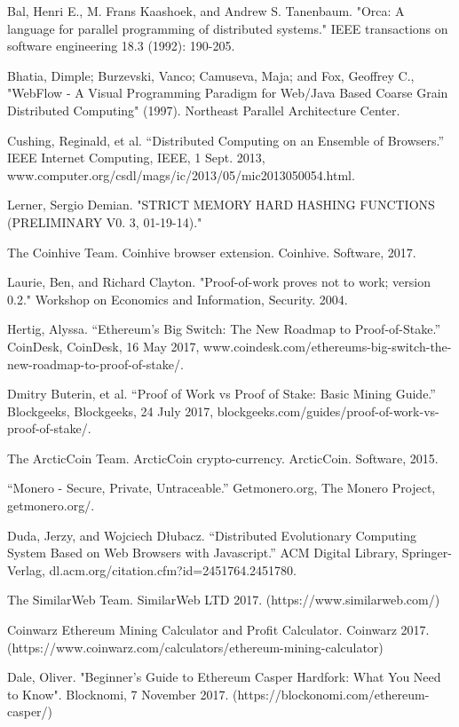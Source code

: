 \documentclass[runningheads]{llncs}
\begin{document}
\begin{thebibliography}{1}
Bal, Henri E., M. Frans Kaashoek, and Andrew S. Tanenbaum. "Orca: A language for parallel programming of distributed systems." IEEE transactions on software engineering 18.3 (1992): 190-205.

Bhatia, Dimple; Burzevski, Vanco; Camuseva, Maja; and Fox, Geoffrey C., "WebFlow - A Visual Programming Paradigm for Web/Java Based Coarse Grain Distributed Computing" (1997).
Northeast Parallel Architecture Center.

 Cushing, Reginald, et al. “Distributed Computing on an Ensemble of Browsers.” IEEE Internet Computing, IEEE, 1 Sept. 2013, www.computer.org/csdl/mags/ic/2013/05/mic2013050054.html.

 Lerner, Sergio Demian. "STRICT MEMORY HARD HASHING FUNCTIONS (PRELIMINARY V0. 3, 01-19-14)."

The Coinhive Team. Coinhive browser extension. Coinhive. Software, 2017.

Laurie, Ben, and Richard Clayton. "Proof-of-work proves not to work; version 0.2." Workshop on Economics and Information, Security. 2004.

Hertig, Alyssa. “Ethereum's Big Switch: The New Roadmap to Proof-of-Stake.” CoinDesk, CoinDesk, 16 May 2017, www.coindesk.com/ethereums-big-switch-the-new-roadmap-to-proof-of-stake/. 

Dmitry Buterin, et al. “Proof of Work vs Proof of Stake: Basic Mining Guide.” Blockgeeks, Blockgeeks, 24 July 2017, blockgeeks.com/guides/proof-of-work-vs-proof-of-stake/. 

The ArcticCoin Team. ArcticCoin crypto-currency. ArcticCoin. Software, 2015.

 “Monero - Secure, Private, Untraceable.” Getmonero.org, The Monero Project, getmonero.org/.

 Duda, Jerzy, and Wojciech Dłubacz. “Distributed Evolutionary Computing System Based on Web Browsers with Javascript.” ACM Digital Library, Springer-Verlag, dl.acm.org/citation.cfm?id=2451764.2451780.

 The SimilarWeb Team. SimilarWeb LTD 2017. (https://www.similarweb.com/)

Coinwarz Ethereum Mining Calculator and Profit Calculator. Coinwarz 2017. (https://www.coinwarz.com/calculators/ethereum-mining-calculator)

Dale, Oliver. "Beginner's Guide to Ethereum Casper Hardfork: What You Need to Know". Blocknomi, 7 November 2017. (https://blockonomi.com/ethereum-casper/)


\end{thebibliography}
\end{document}
